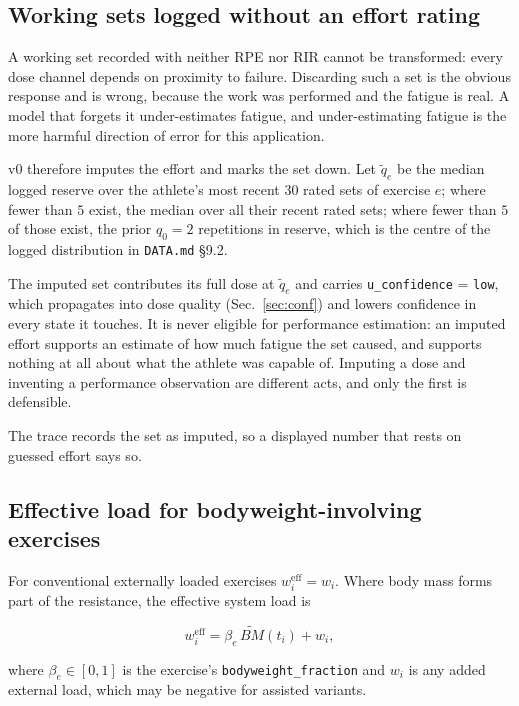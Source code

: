 \documentclass[11pt]{article}
\begin{document}
\subsection{Working sets logged without an effort rating}
\label{sec:imputed-effort}

A working set recorded with neither RPE nor RIR cannot be transformed: every dose channel depends on proximity to failure. Discarding such a set is the obvious response and is wrong, because the work was performed and the fatigue is real. A model that forgets it under-estimates fatigue, and under-estimating fatigue is the more harmful direction of error for this application.

v0 therefore imputes the effort and marks the set down. Let $\tilde q_e$ be the median logged reserve over the athlete's most recent $30$ rated sets of exercise $e$; where fewer than $5$ exist, the median over all their recent rated sets; where fewer than $5$ of those exist, the prior $q_0=2$ repetitions in reserve, which is the centre of the logged distribution in \texttt{DATA.md} \S9.2.

The imputed set contributes its full dose at $\tilde q_e$ and carries \texttt{u\_confidence} = \texttt{low}, which propagates into dose quality (Sec.~\ref{sec:conf}) and lowers confidence in every state it touches. It is never eligible for performance estimation: an imputed effort supports an estimate of how much fatigue the set caused, and supports nothing at all about what the athlete was capable of. Imputing a dose and inventing a performance observation are different acts, and only the first is defensible.

The trace records the set as imputed, so a displayed number that rests on guessed effort says so.

\subsection{Effective load for bodyweight-involving exercises}
\label{sec:bw}

For conventional externally loaded exercises $w_i^{\mathrm{eff}}=w_i$. Where body mass forms part of the resistance, the effective system load is

\begin{equation}
w_i^{\mathrm{eff}}=\beta_e\,\widetilde{BM}(t_i)+w_i,
\end{equation}

where $\beta_e\in[0,1]$ is the exercise's \texttt{bodyweight\_fraction} and $w_i$ is any added external load, which may be negative for assisted variants.
\end{document}
